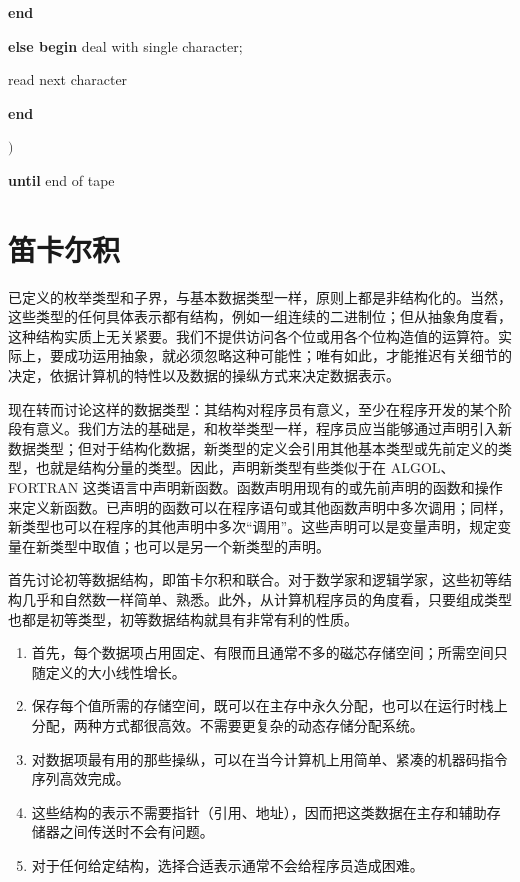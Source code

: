 \documentclass[twoside,11pt,fontset=none]{ctexbook}
\begin{document}
\quad\quad \textbf{end}

\quad \textbf{else begin} deal with single character;

\quad\quad read next character

\quad \textbf{end}

\quad $)$

\textbf{until} end of tape
\section[笛卡尔积]{笛卡尔积}

已定义的枚举类型和子界，与基本数据类型一样，原则上都是非结构化的。当然，这些类型的任何具体表示都有结构，例如一组连续的二进制位；但从抽象角度看，这种结构实质上无关紧要。我们不提供访问各个位或用各个位构造值的运算符。实际上，要成功运用抽象，就必须忽略这种可能性；唯有如此，才能推迟有关细节的决定，依据计算机的特性以及数据的操纵方式来决定数据表示。

现在转而讨论这样的数据类型：其结构对程序员有意义，至少在程序开发的某个阶段有意义。我们方法的基础是，和枚举类型一样，程序员应当能够通过声明引入新数据类型；但对于结构化数据，新类型的定义会引用其他基本类型或先前定义的类型，也就是结构分量的类型。因此，声明新类型有些类似于在 ALGOL、FORTRAN 这类语言中声明新函数。函数声明用现有的或先前声明的函数和操作来定义新函数。已声明的函数可以在程序语句或其他函数声明中多次调用；同样，新类型也可以在程序的其他声明中多次“调用”。这些声明可以是变量声明，规定变量在新类型中取值；也可以是另一个新类型的声明。

首先讨论初等数据结构，即笛卡尔积和联合。对于数学家和逻辑学家，这些初等结构几乎和自然数一样简单、熟悉。此外，从计算机程序员的角度看，只要组成类型也都是初等类型，初等数据结构就具有非常有利的性质。

\begin{enumerate}[wide, nosep, label=(\arabic*)]
	\item 首先，每个数据项占用固定、有限而且通常不多的磁芯存储空间；所需空间只随定义的大小线性增长。

	\item 保存每个值所需的存储空间，既可以在主存中永久分配，也可以在运行时栈上分配，两种方式都很高效。不需要更复杂的动态存储分配系统。

	\item 对数据项最有用的那些操纵，可以在当今计算机上用简单、紧凑的机器码指令序列高效完成。

	\item 这些结构的表示不需要指针（引用、地址），因而把这类数据在主存和辅助存储器之间传送时不会有问题。

	\item 对于任何给定结构，选择合适表示通常不会给程序员造成困难。
\end{enumerate}
\end{document}
